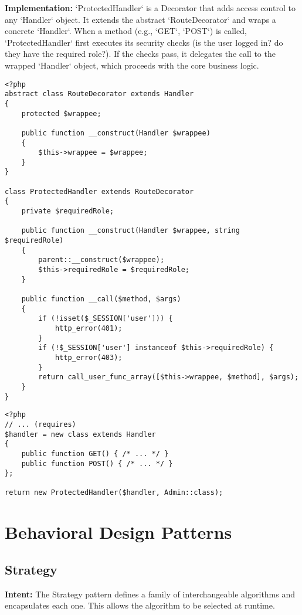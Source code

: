 \documentclass[11pt,a4paper]{article}
\begin{document}
\textbf{Implementation:} `ProtectedHandler` is a Decorator that adds access control to any `Handler` object. It extends the abstract `RouteDecorator` and wraps a concrete `Handler`. When a method (e.g., `GET`, `POST`) is called, `ProtectedHandler` first executes its security checks (is the user logged in? do they have the required role?). If the checks pass, it delegates the call to the wrapped `Handler` object, which proceeds with the core business logic.

\begin{lstlisting}[caption={The Decorator for adding role-based access control.}, label={lst:decorator}]
% Filepath: src\core\ProtectedHandler.php
<?php
abstract class RouteDecorator extends Handler
{
	protected $wrappee;

	public function __construct(Handler $wrappee)
	{
		$this->wrappee = $wrappee;
	}
}

class ProtectedHandler extends RouteDecorator
{
	private $requiredRole;

	public function __construct(Handler $wrappee, string $requiredRole)
	{
		parent::__construct($wrappee);
		$this->requiredRole = $requiredRole;
	}

	public function __call($method, $args)
	{
		if (!isset($_SESSION['user'])) {
			http_error(401);
		}
		if (!$_SESSION['user'] instanceof $this->requiredRole) {
			http_error(403);
		}
		return call_user_func_array([$this->wrappee, $method], $args);
	}
}
\end{lstlisting}
\begin{lstlisting}[caption={Applying the decorator to a controller route.}, label={lst:decorator-usage}]
% Filepath: src\controllers\admin\fundraisers.php
<?php
// ... (requires)
$handler = new class extends Handler
{
	public function GET() { /* ... */ }
	public function POST() { /* ... */ }
};

return new ProtectedHandler($handler, Admin::class);
\end{lstlisting}

\section{Behavioral Design Patterns}

\subsection{Strategy}
\textbf{Intent:} The Strategy pattern defines a family of interchangeable algorithms and encapsulates each one. This allows the algorithm to be selected at runtime.
\end{document}
